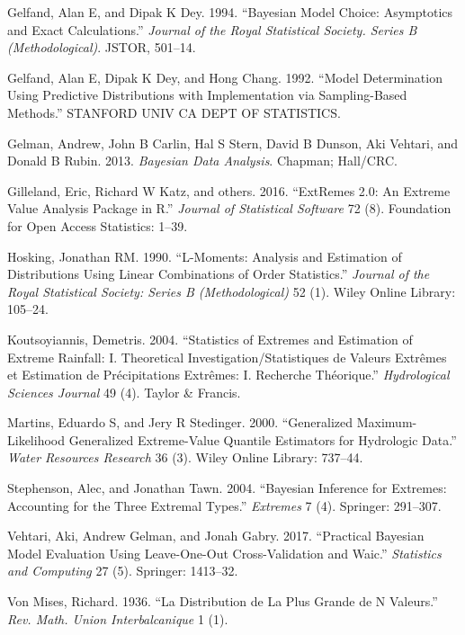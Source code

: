 \documentclass[]{article}
\begin{document}
\leavevmode\hypertarget{ref-gelfand1994bayesian}{}%
Gelfand, Alan E, and Dipak K Dey. 1994. ``Bayesian Model Choice:
Asymptotics and Exact Calculations.'' \emph{Journal of the Royal
Statistical Society. Series B (Methodological)}. JSTOR, 501--14.

\leavevmode\hypertarget{ref-gelfand1992model}{}%
Gelfand, Alan E, Dipak K Dey, and Hong Chang. 1992. ``Model
Determination Using Predictive Distributions with Implementation via
Sampling-Based Methods.'' STANFORD UNIV CA DEPT OF STATISTICS.

\leavevmode\hypertarget{ref-gelman2013bayesian}{}%
Gelman, Andrew, John B Carlin, Hal S Stern, David B Dunson, Aki Vehtari,
and Donald B Rubin. 2013. \emph{Bayesian Data Analysis}. Chapman;
Hall/CRC.

\leavevmode\hypertarget{ref-gilleland2016extremes}{}%
Gilleland, Eric, Richard W Katz, and others. 2016. ``ExtRemes 2.0: An
Extreme Value Analysis Package in R.'' \emph{Journal of Statistical
Software} 72 (8). Foundation for Open Access Statistics: 1--39.

\leavevmode\hypertarget{ref-hosking1990moments}{}%
Hosking, Jonathan RM. 1990. ``L-Moments: Analysis and Estimation of
Distributions Using Linear Combinations of Order Statistics.''
\emph{Journal of the Royal Statistical Society: Series B
(Methodological)} 52 (1). Wiley Online Library: 105--24.

\leavevmode\hypertarget{ref-koutsoyiannis2004statistics}{}%
Koutsoyiannis, Demetris. 2004. ``Statistics of Extremes and Estimation
of Extreme Rainfall: I. Theoretical Investigation/Statistiques de
Valeurs Extrêmes et Estimation de Précipitations Extrêmes: I. Recherche
Théorique.'' \emph{Hydrological Sciences Journal} 49 (4). Taylor \&
Francis.

\leavevmode\hypertarget{ref-martins2000generalized}{}%
Martins, Eduardo S, and Jery R Stedinger. 2000. ``Generalized
Maximum-Likelihood Generalized Extreme-Value Quantile Estimators for
Hydrologic Data.'' \emph{Water Resources Research} 36 (3). Wiley Online
Library: 737--44.

\leavevmode\hypertarget{ref-stephenson2004bayesian}{}%
Stephenson, Alec, and Jonathan Tawn. 2004. ``Bayesian Inference for
Extremes: Accounting for the Three Extremal Types.'' \emph{Extremes} 7
(4). Springer: 291--307.

\leavevmode\hypertarget{ref-vehtari2017practical}{}%
Vehtari, Aki, Andrew Gelman, and Jonah Gabry. 2017. ``Practical Bayesian
Model Evaluation Using Leave-One-Out Cross-Validation and Waic.''
\emph{Statistics and Computing} 27 (5). Springer: 1413--32.

\leavevmode\hypertarget{ref-von1936distribution}{}%
Von Mises, Richard. 1936. ``La Distribution de La Plus Grande de N
Valeurs.'' \emph{Rev. Math. Union Interbalcanique} 1 (1).
\end{document}

